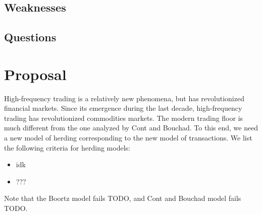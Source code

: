 \documentclass{article}
\begin{document}
\subsection{Weaknesses}


\subsection{Questions}

\section{Proposal}

High-frequency trading is a relatively new phenomena, but has revolutionized financial markets. 
Since its emergence during the last decade, high-frequency trading has revolutionized commodities markets.
The modern trading floor is much different from the one analyzed by Cont and Bouchad.
To this end, we need a new model of herding corresponding to the new model of transactions.
We list the following criteria for herding models:
\begin{itemize}
\item 
  idk
\item 
  ???
\end{itemize}
Note that the Boortz model fails TODO, and Cont and Bouchad model fails TODO.

\end{document}
